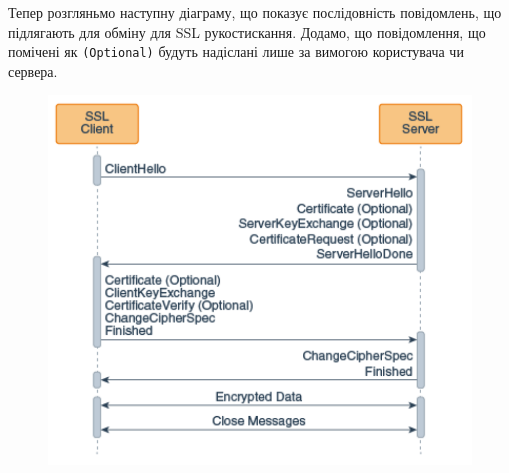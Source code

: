 Тепер розгляньмо наступну діаграму, що показує послідовність повідомлень, що підлягають для обміну для SSL рукостискання. Додамо, що повідомлення, що помічені як \texttt{(Optional)} будуть надіслані лише за вимогою користувача чи сервера.

\begin{figure}[ht]
        \centering
        \includegraphics[scale=0.35]{../IMAGES/tls_1_2.png}
        \label{tls_1_2}
\end{figure}

